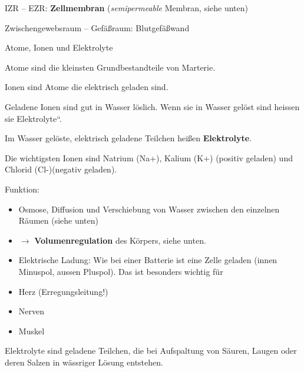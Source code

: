 \documentclass{article}
\newcommand\gEs[1]{\textbf{\textcolor[rgb]{0.0,0.0,0.5019608}{#1}}}
\newcommand\gEs[1]{\textbf{\textcolor[rgb]{0.0,0.0,0.5019608}{#1}}}
\newcommand\gT[1]{\textbf{\textup{\textcolor[rgb]{0.0,0.5019608,0.0}{#1}}}}
\newcommand\gZ[1]{\textcolor[rgb]{0.5019608,0.5019608,0.5019608}{#1}}
\begin{document}
{\mdseries
IZR -- EZR:    \gT{Zellmembran} (\textit{semipermeable}
Membran, siehe unten)}

{\mdseries
Zwischengewebsraum -- Gef\"a{\ss}raum:  Blutgef\"a{\ss}wand}

{\mdseries\color{black}
Atome, Ionen und
Elektrolyte }

{\mdseries
Atome sind die kleinsten Grundbestandteile von Marterie.}

{\mdseries
Ionen sind Atome die elektrisch geladen sind.}

{\mdseries
Geladene Ionen sind gut in Wasser l\"oslich. Wenn sie in Wasser gel\"ost
sind heissen sie {\quotedblbase}Elektrolyte{\textquotedblleft}. }

{\mdseries
Im Wasser gel\"oste, elektrisch geladene Teilchen hei{\ss}en
\gT{Elektrolyte}.}

{\mdseries
Die wichtigsten Ionen sind Natrium (Na+), Kalium (K+) (positiv geladen)
und Chlorid (Cl-)(negativ geladen). }

{\mdseries
Funktion:}

\begin{itemize}
\item {\mdseries
Osmose, Diffusion und Verschiebung von Wasser zwischen den einzelnen
R\"aumen (siehe unten)}

\end{itemize}
\begin{itemize}
\item {\mdseries
${\rightarrow}$ \gEs{Volumenregulation} des
K\"orpers, siehe unten.  }

\end{itemize}
\begin{itemize}
\item {\mdseries
Elektrische Ladung: Wie bei einer Batterie ist eine Zelle geladen (innen
Minuspol, aussen Pluspol). Das ist besonders wichtig f\"ur}

\end{itemize}
\begin{itemize}
\item {\mdseries
Herz (Erregungsleitung!)}

\item {\mdseries
Nerven}

\item {\mdseries
Muskel}

\end{itemize}
{\mdseries
\gZ{Elektrolyte sind geladene Teilchen, die  bei
Aufspaltung von S\"auren, Laugen  oder deren Salzen in w\"assriger
L\"osung  entstehen.}}
\end{document}
